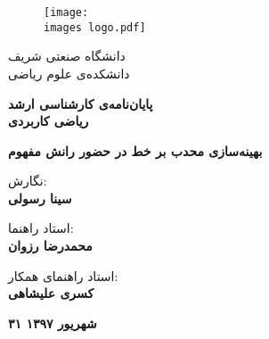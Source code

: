 \documentclass[a4paper,11px]{article}
\begin{document}
\thispagestyle{empty}
\begin{figure}[!hbt]
\centering
\texttt{[image: \\images logo.pdf]}
\centering
\end{figure}

\vspace{-5mm}
\begin{center}
\large
دانشگاه صنعتی شریف\\
دانشکده‌ی علوم ریاضی
\end{center}

\vspace{5mm}
\begin{center}
\large
\textbf{
پایان‌نامه‌ی کارشناسی ارشد\\
ریاضی کاربردی
}
\end{center}


\vspace{5mm}
\begin{center}
\Large
\textbf{
بهینه‌سازی محدب بر خط در حضور رانش مفهوم
}
\end{center}


\vspace{10mm}
\begin{center}
\large
نگارش:
\\
\textbf{
سینا رسولی
}
\end{center}



\vspace{10mm}
\begin{center}
\large
استاد راهنما:
\\
\textbf{
محمدرضا رزوان
}
\end{center}

\vspace{2mm}

\begin{center}
\large
استاد راهنمای همکار:
\\
\textbf{
کسری علیشاهی
}
\end{center}



\vfill
\begin{center}
\Large \textbf{
۳۱ شهریور ۱۳۹۷
}
\end{center}


\newpage


\vfill
\end{document}
